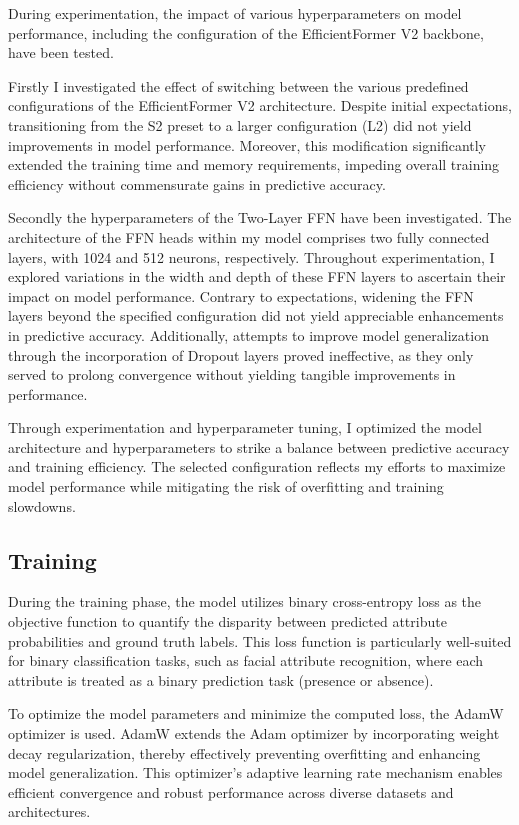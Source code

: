 \documentclass[a4paper,oneside]{article}
\begin{document}
During experimentation, the impact of various hyperparameters on model performance, including the configuration of the EfficientFormer V2 backbone, have been tested.

Firstly I investigated the effect of switching between the various predefined configurations of the EfficientFormer V2 architecture.
Despite initial expectations, transitioning from the S2 preset to a larger configuration (L2) did not yield improvements in model performance.
Moreover, this modification significantly extended the training time and memory requirements, impeding overall training efficiency without commensurate gains in predictive accuracy.

Secondly the hyperparameters of the Two-Layer FFN have been investigated.
The architecture of the FFN heads within my model comprises two fully connected layers, with 1024 and 512 neurons, respectively.
Throughout experimentation, I explored variations in the width and depth of these FFN layers to ascertain their impact on model performance.
Contrary to expectations, widening the FFN layers beyond the specified configuration did not yield appreciable enhancements in predictive accuracy.
Additionally, attempts to improve model generalization through the incorporation of Dropout layers proved ineffective, as they only served to prolong convergence without yielding tangible improvements in performance.

Through experimentation and hyperparameter tuning, I optimized the model architecture and hyperparameters to strike a balance between predictive accuracy and training efficiency.
The selected configuration reflects my efforts to maximize model performance while mitigating the risk of overfitting and training slowdowns.

\subsection{Training}
\label{sec:subsection_training}

During the training phase, the model utilizes binary cross-entropy loss as the objective function to quantify the disparity between predicted attribute probabilities and ground truth labels.
This loss function is particularly well-suited for binary classification tasks, such as facial attribute recognition, where each attribute is treated as a binary prediction task (presence or absence).

To optimize the model parameters and minimize the computed loss, the AdamW optimizer \citet{DBLP:journals/corr/abs-1711-05101} is used.
AdamW extends the Adam optimizer by incorporating weight decay regularization, thereby effectively preventing overfitting and enhancing model generalization.
This optimizer's adaptive learning rate mechanism enables efficient convergence and robust performance across diverse datasets and architectures.
\end{document}
